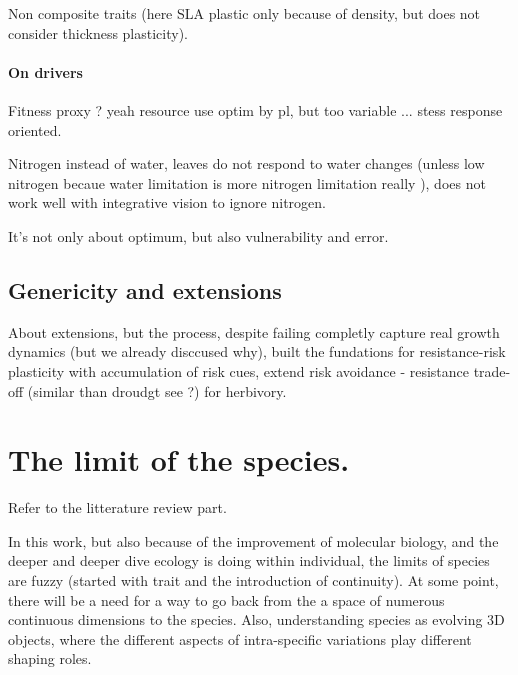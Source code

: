 Non composite traits (here SLA plastic only because of density, but does not consider thickness plasticity).

\paragraph{On drivers}

Fitness proxy ? yeah \cite{ryser_consequences_2000} resource use optim by pl, but \cite{franklin_modeling_2012} too variable ... stess response oriented. 


Nitrogen instead of water, leaves do not respond to water changes (unless low nitrogen becaue water limitation is more nitrogen limitation really \parencite{farrior_competitive_2014}), does not work well with integrative vision to ignore nitrogen.


It's not only about optimum, but also vulnerability and error. 

\subsection{Genericity and extensions}

About extensions, but the process, despite failing completly capture real growth dynamics (but we already disccused why), built the fundations for resistance-risk plasticity with accumulation of risk cues, extend risk avoidance - resistance trade-off (similar than droudgt see \cite{kooyers_evolution_2015}?) for herbivory.

\section{The limit of the species.}

Refer to the litterature review part.

In this work, but also because of the improvement of molecular biology, and the deeper and deeper dive ecology is doing within individual, the limits of species are fuzzy (started with trait and the introduction of continuity). At some point, there will be a need for a way to go back from the a space of numerous continuous dimensions to the species. Also, understanding species as evolving 3D objects, where the different aspects of intra-specific variations play different shaping roles.